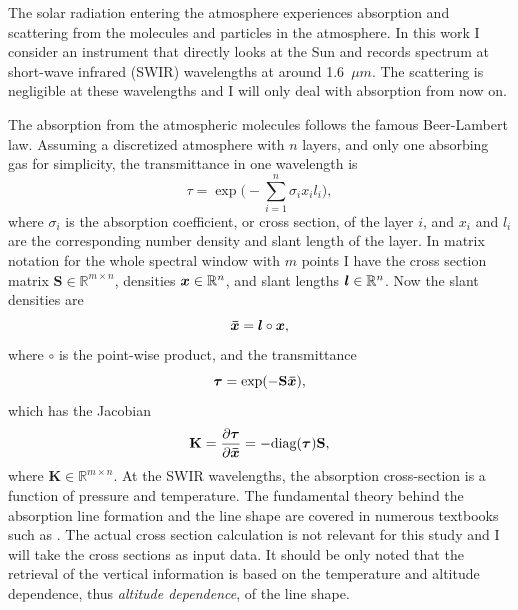 \documentclass[12pt,a4paper]{article}
\newcommand*{\Rset}{\mathbb{R}}  %
\newcommand{\mat}[1]{\mathbf{#1}}
\DeclareRobustCommand*{\vec}[1]{\ensuremath{
\mathchoice{\mbox{\boldmath$\displaystyle#1$}}
           {\mbox{\boldmath$\textstyle#1$}}
           {\mbox{\boldmath$\scriptstyle#1$}}
           {\mbox{\boldmath$\scriptscriptstyle#1$}}}}
\begin{document}
The solar radiation entering the atmosphere experiences absorption and scattering 
from the molecules and particles in the atmosphere. In this work I consider an instrument
that directly looks at the Sun and records spectrum at short-wave infrared (SWIR) wavelengths 
at around 1.6~$\mu m$. The scattering is negligible at these wavelengths 
and I will only deal with absorption from now on.

The absorption from the atmospheric molecules follows the famous Beer-Lambert law.
Assuming a discretized atmosphere with $n$ layers, and
only one absorbing gas for simplicity, the transmittance in one wavelength is
\begin{equation}
\tau=\exp\Big(-\sum_{i=1}^n\sigma_{i} x_{i} l_i\Big),
\end{equation}
where $\sigma_{i}$ is the absorption coefficient, or cross section, of the layer $i$, and $x_{i}$ and $l_i$ are the
corresponding number density and slant length of the layer.
In matrix notation for the whole spectral window with $m$ points I have the cross section 
matrix $\mat{S} \in \Rset^{m \times n}$, densities $\vec{x} \in \Rset^n$, and slant 
lengths $\vec{l} \in \Rset^n$. Now the slant densities are
\begin{equation}
  \vec{\bar{x}} = \vec{l}\circ\vec{x},
  \label{eq:slant_dens}
\end{equation}
where $\circ$ is the point-wise product, and the transmittance
\begin{equation}
  \vec{\tau} = \exp(-\mat{S}\vec{\bar{x}}),
\end{equation}
which has the Jacobian
\begin{equation}
  \label{full_jacobian}
  \mat{K}=\frac{\partial \vec{\tau}}{\partial \vec{\bar{x}}}=-\text{diag}(\vec{\tau})\mat{S},
\end{equation}
where $\mat{K} \in \Rset^{m \times n}$. 
At the SWIR wavelengths, the absorption cross-section is a function of pressure and temperature.
The fundamental theory behind the absorption line formation and the line
shape are covered in numerous textbooks such as \citet{Goody95,Liou02}.
The actual cross section calculation is not relevant for this study and I will
take the cross sections as input data. It should be only noted that
the retrieval of the vertical information is based on the temperature and
altitude dependence, thus \textit{altitude dependence}, of the line shape.
\end{document}
